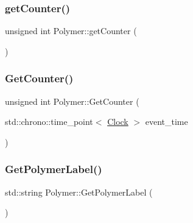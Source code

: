 \subsubsection{\texorpdfstring{get\+Counter()}{getCounter()}\hspace{0.1cm}{\footnotesize\ttfamily [10/10]}}
{\footnotesize\ttfamily unsigned int Polymer\+::get\+Counter (\begin{DoxyParamCaption}{ }\end{DoxyParamCaption})\hspace{0.3cm}{\ttfamily [inline]}}

\mbox{\label{classPolymer_ac33903f9b5d2c73d6ddadcb02ece323e}} 
\subsubsection{\texorpdfstring{Get\+Counter()}{GetCounter()}}
{\footnotesize\ttfamily unsigned int Polymer\+::\+Get\+Counter (\begin{DoxyParamCaption}\item[{std\+::chrono\+::time\+\_\+point$<$ \mbox{\hyperlink{universe_8h_a0ef8d951d1ca5ab3cfaf7ab4c7a6fd80}{Clock}} $>$}]{event\+\_\+time }\end{DoxyParamCaption})\hspace{0.3cm}{\ttfamily [inline]}}

\mbox{\label{classPolymer_a80dbc65ac07e20dce3d9a2e9290c5e3b}} 
\subsubsection{\texorpdfstring{Get\+Polymer\+Label()}{GetPolymerLabel()}}
{\footnotesize\ttfamily std\+::string Polymer\+::\+Get\+Polymer\+Label (\begin{DoxyParamCaption}{ }\end{DoxyParamCaption})\hspace{0.3cm}{\ttfamily [inline]}}

\mbox{\label{classPolymer_aa20f1e5c79e8631afa291569d5030103}} 
